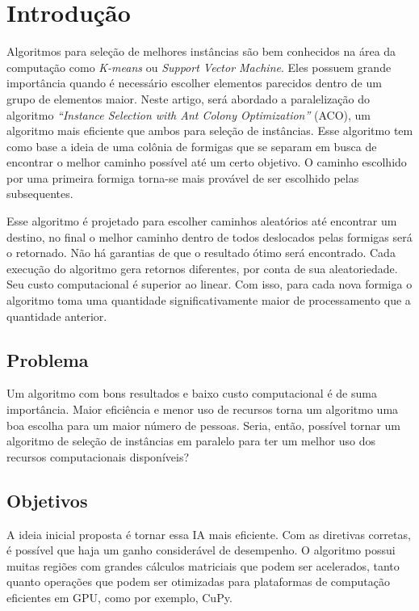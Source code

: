 \section{Introdução}
Algoritmos para seleção de melhores instâncias são bem conhecidos na área da computação como \emph{K-means} ou \emph{Support
Vector Machine}. Eles possuem grande importância quando é necessário escolher elementos parecidos dentro de um grupo de elementos
maior. Neste artigo, será abordado a paralelização do algoritmo \emph{``Instance Selection with Ant Colony Optimization''} (ACO), 
um algoritmo mais eficiente que ambos para seleção de instâncias.
Esse algoritmo tem como base a ideia de uma colônia de formigas que se separam em busca de encontrar o melhor caminho
possível até um certo objetivo. O caminho escolhido por uma primeira formiga torna-se mais provável de ser escolhido
pelas subsequentes.

Esse algoritmo é projetado para escolher caminhos aleatórios até encontrar um destino, no final o melhor caminho dentro de todos deslocados pelas formigas
será o retornado. Não há garantias de que o resultado ótimo será encontrado. Cada execução do algoritmo gera retornos diferentes, por conta
de sua aleatoriedade. Seu custo computacional é superior ao linear. Com isso, para cada nova formiga o algoritmo toma uma quantidade
significativamente maior de processamento que a quantidade anterior.

\subsection{Problema}
Um algoritmo com bons resultados e baixo custo computacional é de suma importância. Maior eficiência e menor uso de recursos
torna um algoritmo uma boa escolha para um maior número de pessoas. Seria, então, possível tornar um algoritmo de seleção de 
instâncias em paralelo para ter um melhor uso dos recursos computacionais disponíveis?


\subsection{Objetivos}

A ideia inicial proposta é tornar essa IA mais eficiente. Com as diretivas corretas, é possível que haja um ganho considerável de 
desempenho. O algoritmo possui muitas regiões com grandes cálculos matriciais que podem ser acelerados, tanto quanto operações que
podem ser otimizadas para plataformas de computação eficientes em GPU, como por exemplo, {CuPy}.

